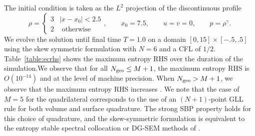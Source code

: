 \documentclass{svjour3}                     %
\begin{document}
The initial condition is taken as the $L^2$ projection of the discontinuous profile
\[
    \rho = \begin{cases}
    3 & |x-x_0| < 2.5\\
    2 & \text{ otherwise}
    \end{cases}, \qquad 
    x_0 = 7.5, \qquad u = v = 0, \qquad p = \rho^\gamma.
\]
We evolve the solution until final time $T = 1.0$ on a domain $[0,15]\times[-.5,.5]$ using the skew symmetric formulation with $N = 6$ and a CFL of $1/2$.  Table~\ref{table:ecrhs} shows the maximum entropy RHS over the duration of the simulation.We observe that for all $N_{\rm geo} \leq M+1$, the maximum entropy RHS is $O(10^{-14})$ and at the level of machine precision.  When $N_{\rm geo}> M+1$, we observe that the maximum entropy RHS increases .  We note that the case of $M= 5$ for the quadrilateral corresponds to the use of an $(N+1)$-point GLL rule for both volume and surface quadrature.  The strong SBP property holds for this choice of quadrature, and the skew-symmetric formulation is equivalent to the entropy stable spectral collocation or DG-SEM  methods of \cite{carpenter2014entropy, gassner2016split}.  

\begin{table}
\centering
{}\\
\caption{Maximum absolute value of the entropy RHS over $t\in [0,1]$ for degree $N=6$ approximations on triangular and quadrilateral meshes.  The volume quadrature for the quadrilateral mesh is taken to be $(N+1)$-point GLL quadrature.  The surface quadrature is taken to be a 1D GLL quadrature with a varying number of points, such that the rule is exact for degree $M+N$ polynomials.  }
\label{table:ecrhs}
\end{table}
\end{document}
